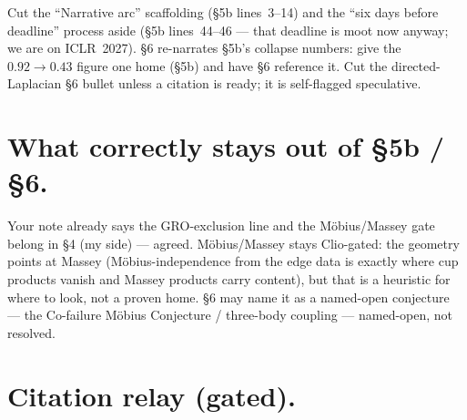 \documentclass[11pt]{article}
\begin{document}
Cut the ``Narrative arc'' scaffolding (\S5b lines~3--14) and the ``six days before
deadline'' process aside (\S5b lines~44--46 --- that deadline is moot now anyway;
we are on ICLR~2027).
\S6 re-narrates \S5b's collapse numbers: give the $0.92 \to 0.43$ figure one home
(\S5b) and have \S6 reference it.
Cut the directed-Laplacian \S6 bullet unless a citation is ready; it is
self-flagged speculative.

\section{What correctly stays out of \S5b / \S6.}

Your note already says the GRO-exclusion line and the M\"{o}bius/Massey gate belong
in \S4 (my side) --- agreed.
M\"{o}bius/Massey stays Clio-gated: the geometry points at Massey
(M\"{o}bius-independence from the edge data is exactly where cup products vanish
and Massey products carry content), but that is a heuristic for where to look, not
a proven home.
\S6 may name it as a named-open conjecture --- the Co-failure M\"{o}bius Conjecture /
three-body coupling --- named-open, not resolved.

\section{Citation relay (gated).}
\end{document}
